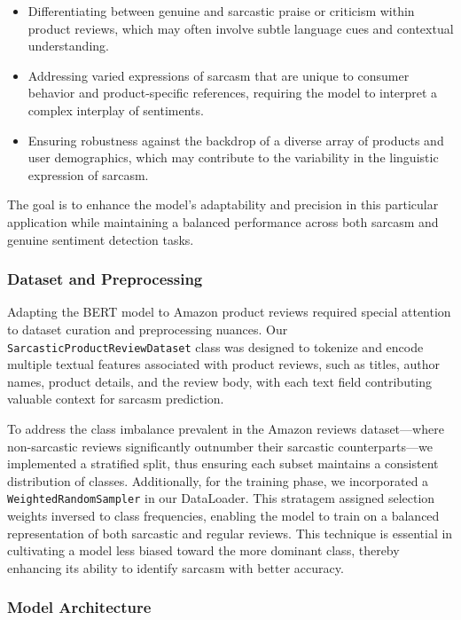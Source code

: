 \documentclass[10pt,twocolumn,letterpaper]{article}
\begin{document}
\begin{itemize}
    \item Differentiating between genuine and sarcastic praise or criticism within product reviews, which may often involve subtle language cues and contextual understanding.
    \item Addressing varied expressions of sarcasm that are unique to consumer behavior and product-specific references, requiring the model to interpret a complex interplay of sentiments.
    \item Ensuring robustness against the backdrop of a diverse array of products and user demographics, which may contribute to the variability in the linguistic expression of sarcasm.
\end{itemize}

The goal is to enhance the model's adaptability and precision in this particular application while maintaining a balanced performance across both sarcasm and genuine sentiment detection tasks.

\subsubsection{Dataset and Preprocessing}
Adapting the BERT model to Amazon product reviews required special attention to dataset curation and preprocessing nuances. Our \texttt{SarcasticProductReviewDataset} class was designed to tokenize and encode multiple textual features associated with product reviews, such as titles, author names, product details, and the review body, with each text field contributing valuable context for sarcasm prediction.

To address the class imbalance prevalent in the Amazon reviews dataset—where non-sarcastic reviews significantly outnumber their sarcastic counterparts—we implemented a stratified split, thus ensuring each subset maintains a consistent distribution of classes. Additionally, for the training phase, we incorporated a \texttt{WeightedRandomSampler} in our DataLoader. This stratagem assigned selection weights inversed to class frequencies, enabling the model to train on a balanced representation of both sarcastic and regular reviews. This technique is essential in cultivating a model less biased toward the more dominant class, thereby enhancing its ability to identify sarcasm with better accuracy.

\subsubsection{Model Architecture}
\end{document}
